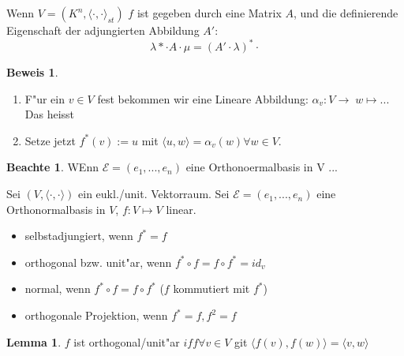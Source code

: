 \documentclass[oneside,fontsize=11pt,paper=a4,BCOR=0mm,DIV=12,automark,headsepline]{scrbook}
\theoremstyle{remark}
\theoremstyle{definition}
\newtheorem*{notte}{Beachte}
\newtheorem{lemma}{Lemma}[section]
\theoremstyle{definition}
\newtheorem*{prof}{Beweis}
\theoremstyle{remark}
\begin{document}
\begin{exa}
  Wenn $V=(K^n, \langle {\cdot, \cdot} \rangle _{st})$ $f$ ist gegeben durch
  eine Matrix $A$, und die definierende Eigenschaft der adjungierten Abbildung
  $A'$:
  \[ \lambda*\cdot A \cdot \mu = (A'\cdot \lambda)^*\cdot\]
\end{exa}

\begin{prof}
  \begin{enumerate}
  \item F"ur ein $v\in V$ fest bekommen wir eine Lineare Abbildung: $\alpha_v:
    V\rightarrow \; w \mapsto $... Das heisst
  \item Setze jetzt $f^*(v):=u$ mit $\langle {u, w} \rangle = \alpha_v(w)\forall
    w\in V$. 
  \end{enumerate}
\end{prof}

\begin{notte}
  WEnn $\mathcal{E}=(e_1, ..., e_n)$ eine Orthonoermalbasis in V ...
\end{notte}

\begin{definition}
   Sei $(V, \langle {\cdot, \cdot} \rangle)$ ein eukl./unit. Vektorraum. Sei
  $\mathcal{E}=(e_1,...,e_n)$ eine Orthonormalbasis in $V$, $f: V\mapsto V $
  linear. 
  \begin{itemize}
  \item selbstadjungiert, wenn $f^*=f$
  \item orthogonal bzw. unit"ar, wenn $f^*\circ f = f\circ f^*=id_v$
  \item normal, wenn $f^*\circ f = f\circ f^* $ ($f$ kommutiert mit $f^*$)
  \item orthogonale Projektion, wenn $f^*=f, f^2=f$
  \end{itemize}
\end{definition}


\begin{lemma}
  $f$ ist orthogonal/unit"ar $iff \forall v\in V$ git $\langle {f(v), f(w)}
  \rangle = \langle {v,w} \rangle$
\end{lemma}
\end{document}
